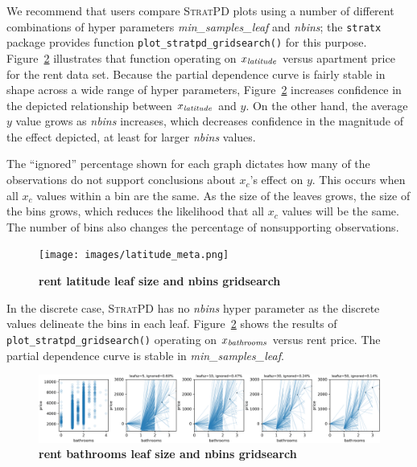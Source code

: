 \documentclass[12pt]{article}
\newcommand{\figref}[1]{Figure~\ref{#1}}
\newcommand{\spd}{\fontfamily{cmr}\textsc{\small StratPD}}
\begin{document}
We recommend that users compare \spd{} plots using a number of different combinations of hyper parameters {\it min\_samples\_leaf} and {\it nbins}; the {\tt stratx} package provides function {\tt plot\_stratpd\_gridsearch()} for this purpose. \figref{fig:rent_grid} illustrates that function operating on $x_{\it latitude}$ versus apartment price for the rent data set. Because the partial dependence curve is fairly stable in shape across a wide range of hyper parameters, \figref{fig:rent_grid} increases confidence in the depicted relationship between $x_{\it latitude}$ and $y$. On the other hand, the average $y$ value grows as {\it nbins} increases, which decreases confidence in the magnitude of the effect depicted, at least for larger {\it nbins} values.

The ``ignored'' percentage shown for each graph dictates how many of the observations do not support conclusions about $x_c$'s effect on $y$. This occurs when all $x_c$ values within a bin are the same. As the size of the leaves grows, the size of the bins grows, which reduces the likelihood that all $x_c$ values will be the same.  The number of bins also changes the percentage of nonsupporting observations.

\begin{figure}[htbp]
\begin{center}
\texttt{[image: images/latitude\_meta.png]}
\caption{{\bf  rent latitude leaf size and nbins gridsearch}}
\label{fig:rent_grid}
\end{center}
\end{figure}

In the discrete case, \spd{} has no {\it nbins} hyper parameter as the discrete values delineate the bins in each leaf. \figref{fig:rent_grid} shows the results of {\tt plot\_stratpd\_gridsearch()} operating on $x_{\it bathrooms}$ versus rent price. The partial dependence curve is stable in {\it min\_samples\_leaf}.

\begin{figure}[htbp]
\begin{center}
\includegraphics[scale=0.5]{images/bathrooms_meta.png}
\caption{{\bf rent bathrooms leaf size and nbins gridsearch}}
\label{fig:rent_grid}
\end{center}
\end{figure}
\end{document}
